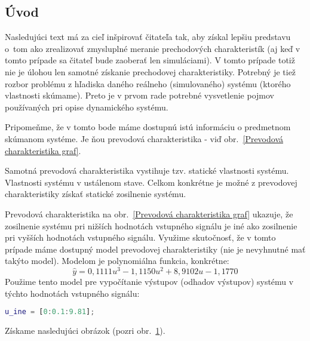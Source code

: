 \documentclass[a4paper, 10pt, ]{article}
\begin{document}


\subsection{Úvod}

Nasledujúci text má za cieľ inšpirovať čitateľa tak, aby získal lepšiu predstavu o~tom ako zrealizovať zmysluplné meranie prechodových charakteristík (aj keď v tomto prípade sa čitateľ bude zaoberať len simuláciami). V tomto prípade totiž nie je úlohou len samotné získanie prechodovej charakteristiky. Potrebný je tiež rozbor problému z hľadiska daného reálneho (simulovaného) systému (ktorého vlastnosti skúmame). Preto je v prvom rade potrebné vysvetlenie pojmov používaných pri opise dynamického systému.



Pripomeňme, že v tomto bode máme dostupnú istú informáciu o predmetnom skúmanom systéme. Je ňou prevodová charakteristika - viď obr.~\ref{Prevodová charakteristika graf}.


Samotná prevodová charakteristika vystihuje tzv. statické vlastnosti systému. Vlastnosti systému v ustálenom stave. Celkom konkrétne je možné z prevodovej charakteristiky získať statické zosilnenie systému.

Prevodová charakteristika na obr.~\ref{Prevodová charakteristika graf} ukazuje, že zosilnenie systému pri nižších hodnotách vstupného signálu je iné ako zosilnenie pri vyšších hodnotách vstupného signálu. Využime skutočnosť, že v tomto prípade máme dostupný model prevodovej charakteristiky (nie je nevyhnutné mať takýto model). Modelom je polynomiálna funkcia, konkrétne:
\begin{equation} \label{modelPolifitVysl2}
    \hat y = 0,1111 u^3  -1,1150 u^2 + 8,9102 u  -1,1770
\end{equation}
Použime tento model pre vypočítanie výstupov (odhadov výstupov) systému v týchto hodnotách vstupného signálu:
\begin{lstlisting}[language=Matlab, numbers=none]
u_ine = [0:0.1:9.81];
\end{lstlisting}
Získame nasledujúci obrázok (pozri obr.~\ref{Prevodová charakteristika graf2}).



\begin{figure}[t]
	\centering


    \vspace{-4mm}

	\caption{}
	\label{Prevodová charakteristika graf2}

\end{figure}
\end{document}
